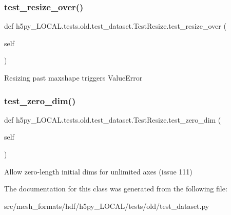 \subsubsection{\texorpdfstring{test\+\_\+resize\+\_\+over()}{test\_resize\_over()}}
{\footnotesize\ttfamily def h5py\+\_\+\+L\+O\+C\+A\+L.\+tests.\+old.\+test\+\_\+dataset.\+Test\+Resize.\+test\+\_\+resize\+\_\+over (\begin{DoxyParamCaption}\item[{}]{self }\end{DoxyParamCaption})}

\begin{DoxyVerb}Resizing past maxshape triggers ValueError \end{DoxyVerb}
 \mbox{\label{classh5py__LOCAL_1_1tests_1_1old_1_1test__dataset_1_1TestResize_af082b3792ed3876ff69354f4e47b62d7}} 
\subsubsection{\texorpdfstring{test\+\_\+zero\+\_\+dim()}{test\_zero\_dim()}}
{\footnotesize\ttfamily def h5py\+\_\+\+L\+O\+C\+A\+L.\+tests.\+old.\+test\+\_\+dataset.\+Test\+Resize.\+test\+\_\+zero\+\_\+dim (\begin{DoxyParamCaption}\item[{}]{self }\end{DoxyParamCaption})}

\begin{DoxyVerb}Allow zero-length initial dims for unlimited axes (issue 111) \end{DoxyVerb}
 

The documentation for this class was generated from the following file\+:\begin{DoxyCompactItemize}
\item 
src/mesh\+\_\+formats/hdf/h5py\+\_\+\+L\+O\+C\+A\+L/tests/old/test\+\_\+dataset.\+py\end{DoxyCompactItemize}
